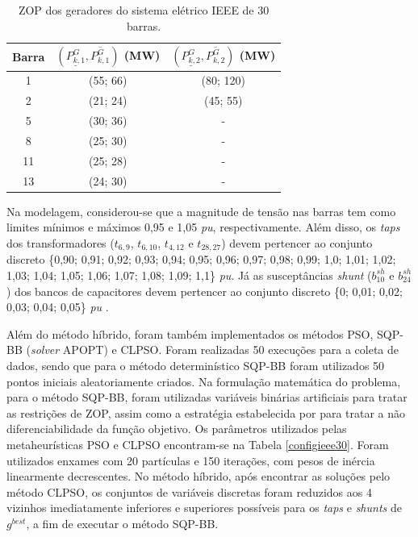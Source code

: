 \documentclass[
	12pt,				%
	openany,			%
	twoside,			%
	a4paper,			%
	chapter=TITLE,		%
	section=Title,		%
	subsection=Title,	%
	subsubsection=Title,%
	english,			%
	french,				%
	spanish,			%
	brazil			%
	]{abntex2}
\begin{document}
\begin{ERRATA}
\begin{table}[h]
\caption{\label{ZOPieee30}ZOP dos geradores do sistema elétrico IEEE de 30 barras.}
\center
\begin{tabular}{c c c}
\hline
 \rule{0mm}{3ex} Barra  & $(\underline{P^G_{k,1}}, \overline{P^G_{k,1}})$ (MW) & $(\underline{P^G_{k,2}}, \overline{P^G_{k,2}})$ (MW)
 \\[2mm]
 \hline
 
1& (55; 66) & (80; 120)  \\
2& (21; 24) & (45; 55)  \\
5& (30; 36) & -  \\
8& (25; 30) & -  \\
11& (25; 28) & -  \\
13& (24; 30) & -\\
\hline
\end{tabular}
\end{table}

Na modelagem, considerou-se que a magnitude de tensão nas barras tem como
limites mínimos e máximos 0,95 e 1,05 \emph{pu}, respectivamente. Além disso, os \emph{taps} dos transformadores ($t_{6,9}$, $t_{6,10}$, $t_{4,12}$ e $t_{28,27}$) devem pertencer ao conjunto discreto \{0,90; 0,91; 0,92; 0,93; 0,94; 0,95; 0,96; 0,97; 0,98; 0,99; 1,0; 1,01; 1,02; 1,03; 1,04; 1,05; 1,06; 1,07; 1,08; 1,09; 1,1\} \emph{pu}. Já as susceptâncias \emph{shunt} ($b^{sh}_{10}$ e $b^{sh}_{24}$) dos bancos de capacitores devem pertencer ao conjunto discreto \{0; 0,01; 0,02; 0,03; 0,04; 0,05\} \emph{pu} \cite{antlion}.

Além do método híbrido, foram também implementados os métodos PSO, SQP-BB
(\emph{solver} APOPT) e CLPSO. Foram realizadas 50 execuções para a coleta de dados, sendo que para o método determinístico SQP-BB foram utilizados 50 pontos iniciais aleatoriamente criados. Na formulação matemática do problema, para o método SQP-BB, foram utilizadas variáveis binárias artificiais para tratar as restrições de ZOP, assim como a estratégia estabelecida por  para tratar a não diferenciabilidade da função objetivo. Os parâmetros utilizados pelas metaheurísticas PSO e CLPSO encontram-se na Tabela \ref{configieee30}. Foram utilizados enxames com 20 partículas e 150 iterações, com pesos de inércia linearmente decrescentes. No método híbrido, após encontrar as soluções pelo método CLPSO, os conjuntos de variáveis discretas foram reduzidos aos 4 vizinhos imediatamente inferiores e superiores possíveis para os \emph{taps} e \emph{shunts} de $g^{best}$, a fim de executar o método SQP-BB.



\end{ERRATA}
\end{document}
